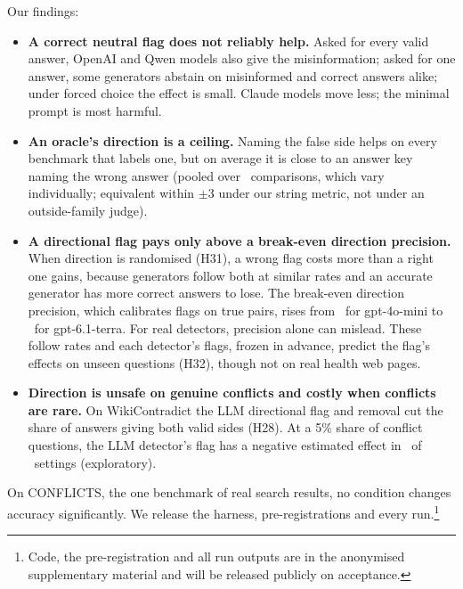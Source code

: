 Our findings:
\begin{itemize}[leftmargin=*,itemsep=1pt,topsep=2pt]
\item \textbf{A correct neutral flag does not reliably help.} Asked for every valid answer, OpenAI and Qwen models also give the
misinformation; asked for one answer, some generators abstain on misinformed and correct answers
alike; under forced choice the effect is small. Claude models move less; the minimal prompt is most harmful.
\item \textbf{An oracle's direction is a ceiling.} Naming the false side helps on every benchmark that labels one, but
on average it is close to an answer key naming the wrong answer (pooled over \PoolTwentyThreeK\
comparisons, which vary individually; equivalent within $\pm$3 under our string metric, not under an outside-family judge).
\item \textbf{A directional flag pays only above a break-even direction precision.} When direction is randomised (H31), a wrong
flag costs more than a right one gains, because generators follow both at similar rates and an accurate generator has
more correct answers to lose. The break-even direction precision, which calibrates flags on true pairs, rises from \beMin\ for gpt-4o-mini to
\beMax\ for gpt-6.1-terra. For real detectors, precision alone can mislead. These follow rates and
each detector's flags, frozen in advance, predict the flag's effects on unseen questions (H32), though not on real health
web pages.
\item \textbf{Direction is unsafe on genuine conflicts and costly when conflicts are rare.} On WikiContradict the LLM
directional flag and removal cut the share of answers giving both valid sides (H28). At a 5\% share of conflict
questions, the LLM detector's flag has a negative estimated effect in \prevNegFive\ of \prevN\ settings (exploratory).
\end{itemize}
On CONFLICTS, the one benchmark of real search results, no condition changes accuracy significantly. We release the harness, pre-registrations and every run.\footnote{Code, the pre-registration and
all run outputs are in the anonymised supplementary material and will be released publicly on acceptance.}
